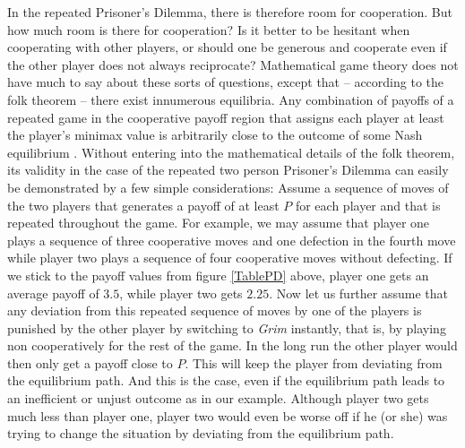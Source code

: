 In the repeated Prisoner's Dilemma, there is therefore room for cooperation.
\label{folkTheorem} But how much room is there for cooperation? Is it better
to be hesitant when cooperating with other players, or should one be generous
and cooperate even if the other player does not always reciprocate?
Mathematical game theory does not have much to say about these sorts of
questions, except that -- according to the folk theorem -- there exist
innumerous equilibria. Any combination of payoffs of a repeated game in the
cooperative payoff region that assigns each player at least the player's
minimax value is arbitrarily close to the outcome of some Nash equilibrium
\cite[p.\ 293]{binmore:1998}. Without entering into the mathematical details of
the folk theorem, its validity in the case of the repeated two person
Prisoner's Dilemma can easily be demonstrated by a few simple considerations:
Assume a sequence of moves of the two players that generates a payoff of at
least $P$ for each player and that is repeated throughout the game. For
example, we may assume that player one plays a sequence of three cooperative
moves and one defection in the fourth move while player two plays a sequence of
four cooperative moves without defecting. If we stick to the payoff values
from figure \ref{TablePD} above, player one gets an average payoff of $3.5$,
while player two gets $2.25$. Now let us further assume that any deviation
from this repeated sequence of moves by one of the players is punished by the
other player by switching to {\em Grim} instantly, that is, by playing non
cooperatively for the rest of the game. In the long run the other player would
then only get a payoff close to $P$. This will keep the player from deviating
from the equilibrium path. And this is the case, even if the equilibrium path
leads to an inefficient or unjust outcome as in our example.  Although player
two gets much less than player one, player two would even be worse off if he
(or she) was trying to change the situation by deviating from the equilibrium
path.

